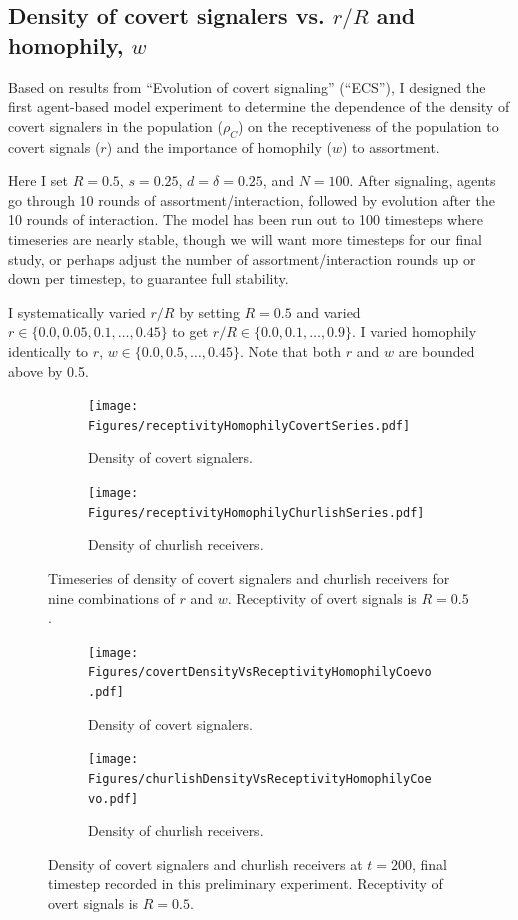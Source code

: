 \documentclass[11pt,letterpaper]{article}
\begin{document}
\subsection{Density of covert signalers vs. $r/R$ and homophily, $w$}

Based on results from ``Evolution of covert signaling'' (``ECS''), I designed
the first agent-based model experiment to determine the dependence of the
density of covert signalers in the population ($\rho_C$) on
the receptiveness of the population to covert signals ($r$) and the
importance of homophily ($w$) to assortment. 

Here I set $R=0.5$, $s=0.25$, $d=\delta=0.25$,
and $N=100$. After signaling, agents go through 10 rounds of assortment/interaction,
followed by evolution after the 10 rounds of interaction. The model has been
run out to 100 timesteps where timeseries are nearly stable, though we will
want more timesteps for our final study, or perhaps adjust the number of 
assortment/interaction rounds up or down per timestep, to guarantee full 
stability.

I systematically varied $r/R$ by setting $R=0.5$ and varied 
$r \in \{0.0, 0.05, 0.1, \ldots, 0.45\}$ to get $r/R \in \{0.0, 0.1, \ldots, 0.9\}$.
I varied homophily identically to $r$, $w \in \{0.0, 0.5, \ldots, 0.45\}$. Note
that both $r$ and $w$ are bounded above by 0.5.

\begin{figure}[H]

  \centering
  \begin{subfigure}{0.49\textwidth}
    \centering
    \texttt{[image: Figures/receptivityHomophilyCovertSeries.pdf]}
    \caption{Density of covert signalers.}
  \end{subfigure}
  \begin{subfigure}{0.49\textwidth}
    \centering
    \texttt{[image: Figures/receptivityHomophilyChurlishSeries.pdf]}
    \caption{Density of churlish receivers.}
  \end{subfigure}
  
  \caption{Timeseries of density of covert signalers and churlish receivers
    for nine combinations of $r$ and $w$. Receptivity of
    overt signals is $R=0.5$.}
  \label{fig:dislikingHomophilySeries}
\end{figure}

\begin{figure}[H]
  \centering
  \begin{subfigure}{0.49\textwidth}
    \centering
    \texttt{[image: Figures/covertDensityVsReceptivityHomophilyCoevo.pdf]}
    \caption{Density of covert signalers.}
  \end{subfigure}
  \begin{subfigure}{0.49\textwidth}
    \centering
    \texttt{[image: Figures/churlishDensityVsReceptivityHomophilyCoevo.pdf]}
    \caption{Density of churlish receivers.}
  \end{subfigure}
  
  \caption{Density of covert signalers and churlish receivers at $t=200$, 
    final timestep recorded in this preliminary experiment. Receptivity of
    overt signals is $R=0.5$.}
  \label{fig:dislikingHomophilyHeatmap}
\end{figure}
\end{document}
